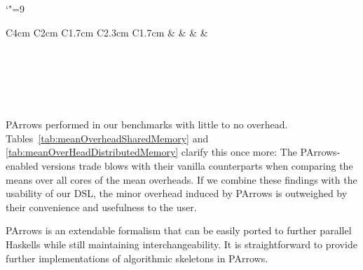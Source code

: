 \documentclass{jfp1}
\newcommand{\comm}[2]{}
\newcommand{\olcomment}[1]{\comm{OL}{#1}}
\begin{document}
\begin{table}[]
\centering
\caption{Overhead in the distributed memory benchmarks. Bold marks values
  in favour of PArrows.}
\label{tab:meanOverHeadDistributedMemory}
\centering
\begingroup\catcode`"=9
\begin{tabular}{C{4cm} C{2cm} C{1.7cm} C{2.3cm} C{1.7cm}}
	 &              &  &  &  \\ \hline \\
	\\ \hline \\
	\\ \hline \\
\end{tabular}
\endgroup
\end{table}

PArrows performed in our benchmarks with little to no overhead. Tables~\ref{tab:meanOverheadSharedMemory} and \ref{tab:meanOverHeadDistributedMemory} clarify this once more: The PArrows-enabled versions trade blows with their vanilla counterparts when comparing the means over all cores of the mean overheads. If we combine these findings with the usability of our DSL,
the minor overhead induced by PArrows is outweighed by their convenience and usefulness to the user.

PArrows is an extendable formalism that can be easily ported to further parallel Haskells while still maintaining interchangeability. It is straightforward to provide further implementations of algorithmic skeletons in PArrows.
	
\end{document}
